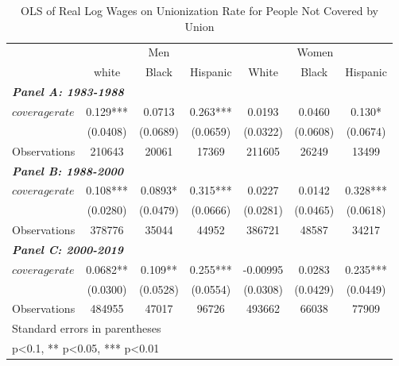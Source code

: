 \begin{table}[h!]\centering
\def\sym#1{\ifmmode^{#1}\else\(^{#1}\)\fi}
\caption{OLS of Real Log Wages on Unionization Rate for People Not Covered by Union}\label{tab:nlincovrate}
\begin{tabular}{l*{6}{c}}
\hline
&\multicolumn{3}{c}{Men}                        &\multicolumn{3}{c}{Women}                      \\\cmidrule(lr){2-4}\cmidrule(lr){5-7}
&\multicolumn{1}{c}{white}&\multicolumn{1}{c}{Black}&\multicolumn{1}{c}{Hispanic}&\multicolumn{1}{c}{White}&\multicolumn{1}{c}{Black}&\multicolumn{1}{c}{Hispanic}\\
\hline
\multicolumn{3}{l}{\linebreak \textbf{\textit{Panel A: 1983-1988}}} \\
$ coveragerate $    &       0.129***&      0.0713   &       0.263***&      0.0193   &      0.0460   &       0.130*  \\
&    (0.0408)   &    (0.0689)   &    (0.0659)   &    (0.0322)   &    (0.0608)   &    (0.0674)   \\
\hline
Observations        &      210643   &       20061   &       17369   &      211605   &       26249   &       13499   \\
\hline
\multicolumn{3}{l}{\linebreak \textbf{\textit{Panel B: 1988-2000}}} \\
$ coveragerate $    &       0.108***&      0.0893*  &       0.315***&      0.0227   &      0.0142   &       0.328***\\
&    (0.0280)   &    (0.0479)   &    (0.0666)   &    (0.0281)   &    (0.0465)   &    (0.0618)   \\
\hline
Observations        &      378776   &       35044   &       44952   &      386721   &       48587   &       34217   \\
\hline
\multicolumn{3}{l}{\linebreak \textbf{\textit{Panel C: 2000-2019}}} \\
$ coveragerate $    &      0.0682** &       0.109** &       0.255***&    -0.00995   &      0.0283   &       0.235***\\
&    (0.0300)   &    (0.0528)   &    (0.0554)   &    (0.0308)   &    (0.0429)   &    (0.0449)   \\
\hline
Observations        &      484955   &       47017   &       96726   &      493662   &       66038   &       77909   \\
\hline\hline
\multicolumn{7}{l}{\footnotesize Standard errors in parentheses}\\
\multicolumn{7}{l}{\footnotesize * p<0.1, ** p<0.05, *** p<0.01}\\
\end{tabular}
\end{table}
